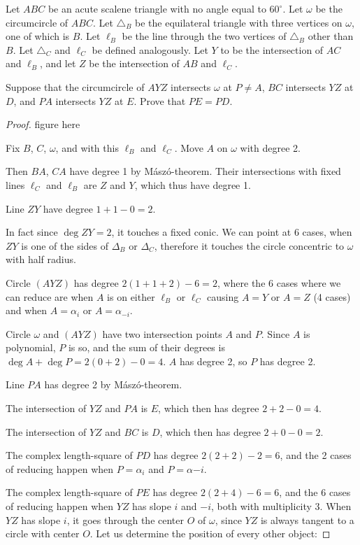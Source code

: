 \documentclass[a4paper]{article}
\begin{document}
\begin{exercise}[2026 USAJMO P3]
    Let $ABC$ be an acute scalene triangle with no angle equal to $60^{\circ}$. Let $\omega$ be the circumcircle of $ABC$. Let $\triangle_B$ be the equilateral triangle with three vertices on $\omega$, one of which is $B$. Let $\ell_B$ be the line through the two vertices of $\triangle_B$ other than $B$. Let $\triangle_C$ and $\ell_C$ be defined analogously. Let $Y$ to be the intersection of $AC$ and $\ell_B$, and let $Z$ be the intersection of $AB$ and $\ell_C$.

Suppose that the circumcircle of $AYZ$ intersects $\omega$ at $P\neq A$, $BC$ intersects $YZ$ at $D$, and $PA$ intersects $YZ$ at $E$. Prove that $PE=PD$.
\end{exercise}
\begin{proof}
    figure here

    Fix $B$, $C$, $\omega$, and with this $\ell_B$ and $\ell_C$. Move $A$ on $\omega$ with degree 2.

    Then $BA$, $CA$ have degree 1 by Mászó-theorem. Their intersections with fixed lines $\ell_C$ and $\ell_B$ are $Z$ and $Y$, which thus have degree 1.

    Line $ZY$ have degree $1+1-0=2$.

    In fact since $\deg ZY=2$, it touches a fixed conic. We can point at 6 cases, when $ZY$ is one of the sides of $\Delta_B$ or $\Delta_C$, therefore it touches the circle concentric to $\omega$ with half radius.

    Circle $(AYZ)$ has degree $2(1+1+2)-6=2$, where the 6 cases where we can reduce are
    when $A$ is on either $\ell_B$ or $\ell_C$ causing $A=Y$ or $A=Z$ (4 cases) and when $A=\alpha_i$ or $A=\alpha_{-i}$.

    Circle $\omega$ and $(AYZ)$ have two intersection points $A$ and $P$. Since $A$ is polynomial, $P$ is so, and the sum of their degrees is $\deg A+\deg P=2(0+2)-0=4$. $A$ has degree 2, so $P$ has degree 2.

    Line $PA$ has degree 2 by Mászó-theorem.

    The intersection of $YZ$ and $PA$ is $E$, which then has degree $2+2-0=4$.

    The intersection of $YZ$ and $BC$ is $D$, which then has degree $2+0-0=2$.

    The complex length-square of $PD$ has degree $2(2+2)-2=6$, and the 2 cases of reducing happen when $P=\alpha_i$ and $P=\alpha{-i}$.

    The complex length-square of $PE$ has degree $2(2+4)-6=6$, and the 6 cases of reducing happen when $YZ$ has slope $i$ and $-i$, both with multiplicity 3. When $YZ$ has slope $i$, it goes through the center $O$ of $\omega$, since $YZ$ is always tangent to a circle with center $O$. Let us determine the position of every other object:


\end{proof}
\end{document}

